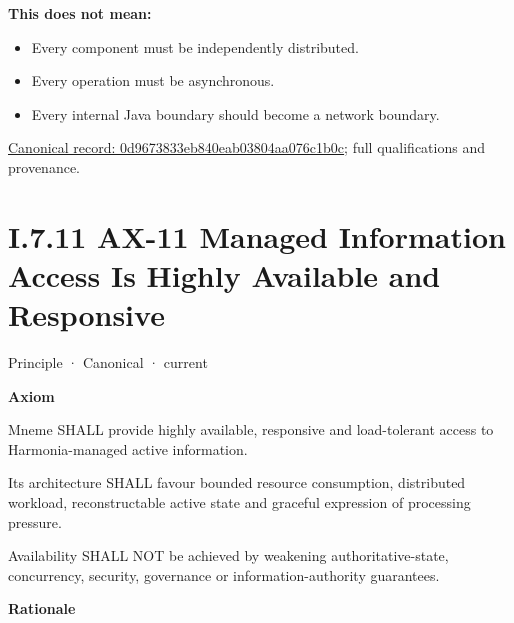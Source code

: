 \textbf{This does not mean:}



\begin{itemize}


\item Every component must be independently distributed.

\item Every operation must be asynchronous.

\item Every internal Java boundary should become a network boundary.

\end{itemize}

{\footnotesize \href{../../../../continuum/motivation/principle/0d9673833eb840eab03804aa076c1b0c.md}{Canonical record: 0d9673833eb840eab03804aa076c1b0c}; full qualifications and provenance.}\par
\section*{I.7.11 AX-11 Managed Information Access Is Highly Available and Responsive}
\label{navigation:I.7.11}

\label{element:8a1e995f16954484a78ae1c5c114d546}
{\small Principle · Canonical · current}\par

\par\medskip\textbf{Axiom}\par


Mneme SHALL provide highly available, responsive and load-tolerant
access to Harmonia-managed active information.



Its architecture SHALL favour bounded resource consumption, distributed
workload, reconstructable active state and graceful expression of
processing pressure.



Availability SHALL NOT be achieved by weakening authoritative-state,
concurrency, security, governance or information-authority guarantees.



\par\medskip\textbf{Rationale}\par


